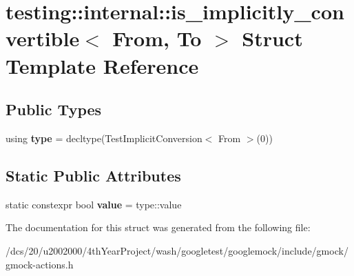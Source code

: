 \hypertarget{structtesting_1_1internal_1_1is__implicitly__convertible}{}\section{testing\+:\+:internal\+:\+:is\+\_\+implicitly\+\_\+convertible$<$ From, To $>$ Struct Template Reference}
\label{structtesting_1_1internal_1_1is__implicitly__convertible}
\subsection*{Public Types}
\begin{DoxyCompactItemize}
\item 
\mbox{\label{structtesting_1_1internal_1_1is__implicitly__convertible_a9bfd3ef48354aa5caba0f2b26c584085}} 
using {\bfseries type} = decltype(Test\+Implicit\+Conversion$<$ From $>$(0))
\end{DoxyCompactItemize}
\subsection*{Static Public Attributes}
\begin{DoxyCompactItemize}
\item 
\mbox{\label{structtesting_1_1internal_1_1is__implicitly__convertible_acd2b537534fff2e762fe454d1cedc96c}} 
static constexpr bool {\bfseries value} = type\+::value
\end{DoxyCompactItemize}


The documentation for this struct was generated from the following file\+:\begin{DoxyCompactItemize}
\item 
/dcs/20/u2002000/4th\+Year\+Project/wash/googletest/googlemock/include/gmock/gmock-\/actions.\+h\end{DoxyCompactItemize}
